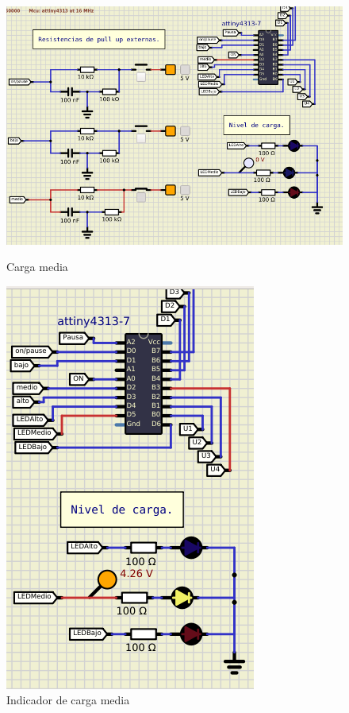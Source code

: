 \begin{figure}[H]
   \begin{minipage}{0.48\textwidth}
     \centering
     \includegraphics[width=.7\linewidth]{Imagenes/6.png}
     \caption{Carga media}\label{F12}
   \end{minipage}\hfill
   \begin{minipage}{0.48\textwidth}
     \centering
     \includegraphics[width=.7\linewidth]{Imagenes/7.png}
     \caption{Indicador de carga media }\label{F13}
   \end{minipage}
\end{figure}
